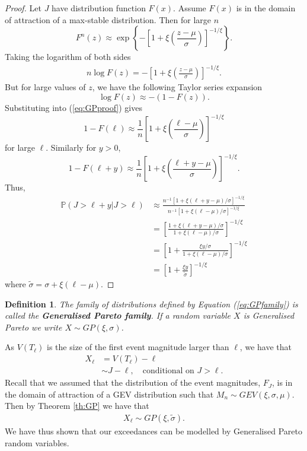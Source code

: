 \documentclass[honours,12pt,twoside, openright]{unswthesis}
\newcommand{\PP}{\mathbb{P}}
\newcommand{\1}{\mathbf 1}
\newtheorem{definition}[equation]{Definition}
\numberwithin{equation}{section}
\theoremstyle{definition}
\theoremstyle{remark}
\begin{document}
\begin{proof}\cite{Leadbetter1983}
Let $J$ have distribution function $F(x)$. Assume $F(x)$ is in the domain of attraction of a max-stable distribution. Then for large $n$
\[
	F^n(z)\approx\exp\left\{-\left[1+\xi\left(\frac{z-\mu}{\sigma}\right)\right]^{-1/\xi}\right\}.
\]
Taking the logarithm of both sides
\begin{align}\label{eq:GPproof}
	n \log F(z) = -\left[1+\xi\left(\frac{z-\mu}{\sigma}\right)\right]^{-1/\xi}.
\end{align}
But for large values of $z$, we have the following Taylor series expansion
\[
	\log F(z)\approx -(1-F(z)).
\]
Substituting into (\ref{eq:GPproof}) gives
\[
	1-F(\ell) \approx \frac{1}{n}\left[1+\xi\left(\frac{\ell-\mu}{\sigma}\right)\right]^{-1/\xi}
\]
for large $\ell$. Similarly for $y>0$,
\[
	1-F(\ell+y) \approx \frac{1}{n}\left[1+\xi\left(\frac{\ell+y-\mu}{\sigma}\right)\right]^{-1/\xi}.
\]
Thus,
\begin{align*}
	\PP(J>\ell+y|J>\ell) &\approx \frac{n^{-1}[1+\xi(\ell+y-\mu)/\sigma]^{-1/\xi}}{n^{-1}[1+\xi(\ell-\mu)/\sigma]^{-1/\xi}}\\
	&=\left[\frac{1+\xi(\ell+y-\mu)/\sigma}{1+\xi(\ell-\mu)/\sigma}\right]^{-1/\xi}\\
	&=\left[1+\frac{\xi y/\sigma}{1+\xi(\ell-\mu)/\sigma}\right]^{-1/\xi}\\
	&=\left[1+\frac{\xi y}{\tilde \sigma}\right]^{-1/\xi}
\end{align*}
where $\tilde\sigma=\sigma+\xi(\ell-\mu)$.
\end{proof}

\begin{definition}
The family of distributions defined by Equation (\ref{eq:GPfamily}) is called the \textbf{Generalised Pareto family}. If a random variable $X$ is Generalised Pareto we write $X\sim GP(\xi,\sigma)$.\\
\end{definition}
\noindent As $V(T_\ell)$ is the size of the first event magnitude larger than $\ell$, we have that
\begin{align*}
	X_\ell&=V(T_\ell)-\ell\\
		  &\sim J-\ell, \quad \textrm{conditional on $J>\ell$}.
\end{align*}
Recall that we assumed that the distribution of the event magnitudes, $F_J$, is in the domain of attraction of a GEV distribution such that $M_n \sim GEV(\xi,\sigma,\mu)$. Then by Theorem \ref{th:GP} we have that 
\begin{align}\label{eq:GPdist}
X_\ell\sim GP(\xi,\tilde \sigma).
\end{align}
We have thus shown that our exceedances can be modelled by Generalised Pareto random variables.
\end{document}

